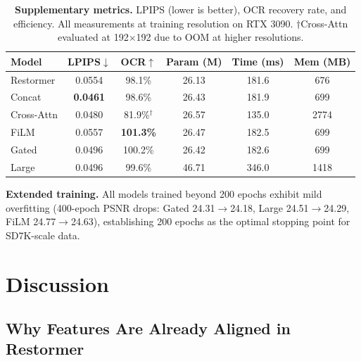 \documentclass[pdflatex,sn-basic,Numbered]{sn-jnl}
\theoremstyle{thmstyleone}
\theoremstyle{thmstyletwo}
\theoremstyle{thmstylethree}
\begin{document}
\begin{table}[t]
\caption{\textbf{Supplementary metrics.} LPIPS (lower is better), OCR recovery rate, and efficiency. All measurements at training resolution on RTX 3090. $\dagger$Cross-Attn evaluated at 192$\times$192 due to OOM at higher resolutions.}
\label{tab:supplementary}
\footnotesize
\begin{tabular}{@{}lccccc@{}}
\toprule
\textbf{Model} & \textbf{LPIPS}$\downarrow$ & \textbf{OCR}$\uparrow$ & \textbf{Param (M)} & \textbf{Time (ms)} & \textbf{Mem (MB)} \\
\midrule
Restormer  & 0.0554 & 98.1\%  & 26.13 & 181.6 & 676 \\
Concat     & \textbf{0.0461} & 98.6\%  & 26.43 & 181.9 & 699 \\
Cross-Attn & 0.0480 & 81.9\%$^\dagger$ & 26.57 & 135.0 & 2774 \\
FiLM       & 0.0557 & \textbf{101.3\%} & 26.47 & 182.5 & 699 \\
Gated      & 0.0496 & 100.2\% & 26.42 & 182.6 & 699 \\
Large      & 0.0496 & 99.6\%  & 46.71 & 346.0 & 1418 \\
\bottomrule
\end{tabular}
\end{table}

\textbf{Extended training.}
All models trained beyond 200 epochs exhibit mild overfitting (400-epoch PSNR drops: Gated 24.31$\rightarrow$24.18, Large 24.51$\rightarrow$24.29, FiLM 24.77$\rightarrow$24.63), establishing 200 epochs as the optimal stopping point for SD7K-scale data.

\section{Discussion}\label{sec:discussion}

\subsection{Why Features Are Already Aligned in Restormer}
\end{document}
